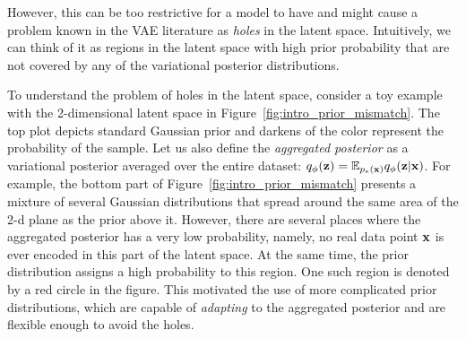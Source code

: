 However, this can be too restrictive for a model to have and might cause a problem known in the VAE literature as \textit{holes} in the latent space. Intuitively, we can think of it as regions in the latent space with high prior probability that are not covered by any of the variational posterior distributions. 

To understand the problem of holes in the latent space, consider a toy example with the 2-dimensional latent space in Figure~\ref{fig:intro_prior_mismatch}. The top plot depicts standard Gaussian prior and darkens of the color represent the probability of the sample. Let us also define the \textit{aggregated posterior} as a variational posterior averaged over the entire dataset: $q_{\phi}({\mathbf{z}}) = \mathbb{E}_{p_{e}({\mathbf{x}})}q_{\phi}({\mathbf{z}}|{\mathbf{x}})$. For example, the bottom part of Figure~\ref{fig:intro_prior_mismatch} presents a mixture of several Gaussian distributions that spread around the same area of the 2-d plane as the prior above it. However, there are several places where the aggregated posterior has a very low probability, namely, no real data point ${\mathbf{x}}$ is ever encoded in this part of the latent space. At the same time, the prior distribution assigns a high probability to this region. One such region is denoted by a red circle in the figure. 
This motivated the use of more complicated prior distributions, which are capable of \textit{adapting} to the aggregated posterior and are flexible enough to avoid the holes. 

